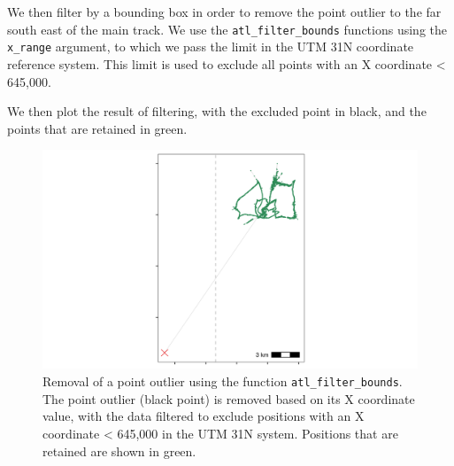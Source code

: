 \documentclass[]{scrreprt}
\newenvironment{Shaded}{}{}
\newcommand{\CommentTok}[1]{\textcolor[rgb]{0.00,0.50,0.00}{#1}}
\newcommand{\DataTypeTok}[1]{#1}
\newcommand{\DecValTok}[1]{#1}
\newcommand{\KeywordTok}[1]{\textcolor[rgb]{0.00,0.00,1.00}{#1}}
\newcommand{\NormalTok}[1]{#1}
\newcommand{\OperatorTok}[1]{#1}
\newcommand{\OtherTok}[1]{\textcolor[rgb]{1.00,0.25,0.00}{#1}}
\newcommand{\StringTok}[1]{\textcolor[rgb]{0.00,0.50,0.50}{#1}}
\begin{document}
We then filter by a bounding box in order to remove the point outlier to the far south east of the main track. We use the \texttt{atl\_filter\_bounds} functions using the \texttt{x\_range} argument, to which we pass the limit in the UTM 31N coordinate reference system.
This limit is used to exclude all points with an X coordinate \textless{} 645,000.

We then plot the result of filtering, with the excluded point in black, and the points that are retained in green.

\begin{Shaded}
\end{Shaded}

\begin{figure}
\centering
\includegraphics{figures/fig_calib_bbox.png}
\caption{Removal of a point outlier using the function \texttt{atl\_filter\_bounds}. The point outlier (black point) is removed based on its X coordinate value, with the data filtered to exclude positions with an X coordinate \textless{} 645,000 in the UTM 31N system. Positions that are retained are shown in green.}
\end{figure}
\end{document}

